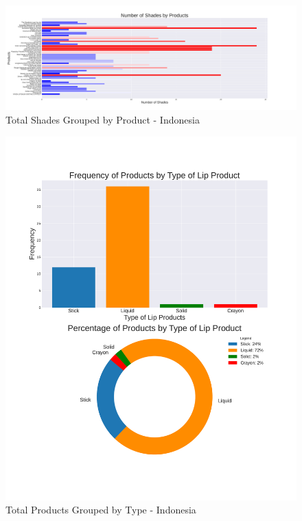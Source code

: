 \documentclass{article}
\begin{document}
\begin{center}
    \begin{landscape}
        \begin{figure}[htbp]
            \centering
            \includegraphics[scale=0.49]{../images/Indonesia-graphs/TotalShadesByProduct.pdf}
            \caption{Total Shades Grouped by Product - Indonesia}
            \label{Shades_by_Product}
        \end{figure}
    \end{landscape}

    \begin{figure}[htbp]
        \centering
        \includegraphics[scale=0.6]{../images/Indonesia-graphs/TotalProductsbyType.pdf}
        \caption{Total Products Grouped by Type - Indonesia}
        \label{Products_by_Type}
    \end{figure}


\end{center}
\end{document}
